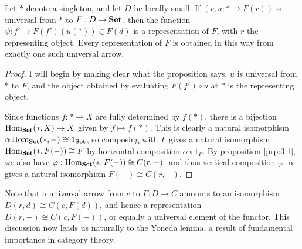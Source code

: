 \begin{proposition}\label{prp:1.2}
	Let $*$ denote a singleton, and let $D$ be locally small. If $(r,u : * \to F(r))$ is universal from $*$ to $F : D \to \mathbf{Set} $, then the function $\psi : f' \mapsto F(f')(u(*))\in F(d)$ is a representation of $F$, with $r$ the representing object. Every representation of $F$ is obtained in this way from exactly one such universal arrow.
\end{proposition}
\begin{proof}
	I will begin by making clear what the proposition says. $u$ is universal from $*$ to $F$, and the object obtained by evaluating $F(f')\circ u$ at $*$ is the representing object.

	Since functions $f : * \to X$ are fully determined by $f(*)$, there is a bijection $\operatorname{Hom}_{\mathbf{Set} }(*, X) \to X$ given by $f\mapsto f(*)$. This is clearly a natural isomorphism $\alpha \operatorname{Hom}_{\mathbf{Set} }(*, -) \cong 1_{\mathbf{Set} } $, so composing with $F$ gives a natural isomorphism $\operatorname{Hom}_{\mathbf{Set} }(*, F(-)) \cong F$ by horizontal composition $\alpha \circ 1_F$. By proposition \ref{prp:3.1}, we also have $\varphi :\operatorname{Hom}_{\mathbf{Set} }(*, F(-)) \cong C(r,-)$, and thus vertical composition $\varphi \cdot \alpha $ gives a natural isomorphism $F(-)\cong C(r,-)$.
\end{proof}

Note that a universal arrow from $c$ to $F : D \to C$ amounts to an isomorphism $D(r,d)\cong C(c,F(d))$, and hence a representation $D(r,-)\cong C(c,F(-))$, or equally a universal element of the functor. This discussion now leads us naturally to the Yoneda lemma, a result of fundamental importance in category theory.

